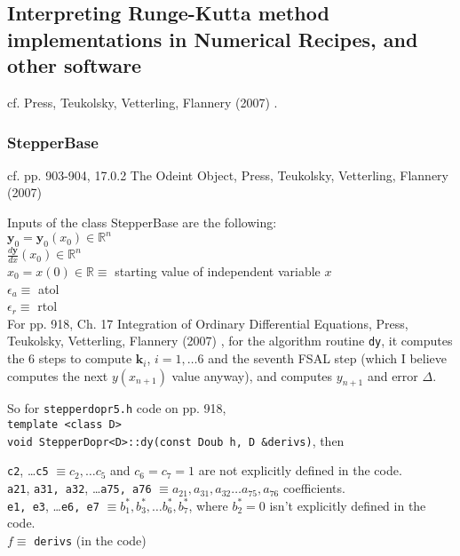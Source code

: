 \documentclass[10pt]{amsart}
\begin{document}
\begin{multicols*}{2}
\subsection{Interpreting Runge-Kutta method implementations in \textbf{Numerical Recipes}, and other software}

cf. Press, Teukolsky, Vetterling, Flannery (2007) \cite{PTVF2007}.

\subsubsection{StepperBase}

cf. pp. 903-904, 17.0.2 The Odeint Object, Press, Teukolsky, Vetterling, Flannery (2007) \cite{PTVF2007}

Inputs of the class StepperBase are the following: \\
$\mathbf{y}_0 = \mathbf{y}_0(x_0) \in \mathbb{R}^n$ \\
$\frac{d\mathbf{y}}{dx}(x_0) \in \mathbb{R}^n $ \\
$x_0 = x(0) \in \mathbb{R} \equiv $ starting value of independent variable $x$ \\
$\epsilon_a \equiv $ atol \\
$\epsilon_r \equiv $ rtol \\

For pp. 918, Ch. 17 Integration of Ordinary Differential Equations, Press, Teukolsky, Vetterling, Flannery (2007) \cite{PTVF2007}, for the algorithm routine \texttt{dy}, it computes the 6 steps to compute $\mathbf{k}_i$, $i=1, \dots 6$ and the seventh FSAL step (which I believe computes the next $y(x_{n+1})$ value anyway), and computes $y_{n+1}$ and error $\Delta$.

So for \texttt{stepperdopr5.h} code on pp. 918, \\
\verb|template <class D>| \\
\verb|void StepperDopr<D>::dy(const Doub h, D &derivs)|, then

\texttt{c2}, \dots \texttt{c5} $\equiv c_2, \dots c_5$ and $c_6 = c_7 = 1$ are not explicitly defined in the code. \\
\texttt{a21}, \texttt{a31, a32}, \dots \texttt{a75, a76} $\equiv a_{21}, a_{31}, a_{32} \dots a_{75}, a_{76}$ coefficients. \\
\texttt{e1, e3}, \dots \texttt{e6, e7} $\equiv b^*_1, b^*_3, \dots b^*_6 , b^*_7$, where $b^*_2 = 0$ isn't explicitly defined in the code. \\

$f \equiv $ \texttt{derivs} (in the code) \\


\end{multicols*}
\end{document}
